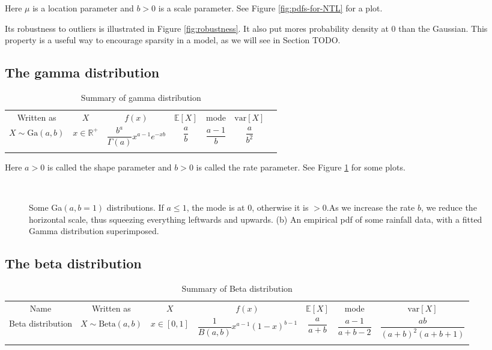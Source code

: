 Here $\mu$ is a location parameter and $b>0$ is a scale parameter. See Figure \ref{fig:pdfs-for-NTL} for a plot.

Its robustness to outliers is illustrated in Figure \ref{fig:robustness}. It also put mores probability density at 0 than the Gaussian. This property is a useful way to encourage sparsity in a model, as we will see in Section TODO.


\subsection{The gamma distribution}

\begin{table}
\caption{Summary of gamma distribution}
\centering
\begin{tabular}{ccccccc}
\hline\noalign{\smallskip}
Written as & $X$ & $f(x)$ & $\mathbb{E}[X]$ & mode & $\text{var}[X]$ \\
\noalign{\smallskip}\svhline\noalign{\smallskip}
$X \sim \text{Ga}(a,b)$ & $x \in \mathbb{R}^+$ & $\dfrac{b^a}{\Gamma(a)}x^{a-1}e^{-xb}$ & $\dfrac{a}{b}$ & $\dfrac{a-1}{b}$ & $\dfrac{a}{b^2}$ \\
\noalign{\smallskip}\hline
\end{tabular}
\end{table} 

Here $a>0$ is called the shape parameter and $b>0$ is called the rate parameter. See Figure \ref{fig:gamma-distribution} for some plots.

\begin{figure}[hbtp]
\centering
{} \\
\caption{Some Ga$(a, b=1)$ distributions. If $a \leq 1$, the mode is at 0, otherwise it is $>0$.As we increase the rate $b$, we reduce the horizontal scale, thus squeezing everything leftwards and upwards. (b) An empirical pdf of some rainfall data, with a fitted Gamma distribution superimposed.}
\label{fig:gamma-distribution} 
\end{figure}


\subsection{The beta distribution}

\begin{table*}
\caption{Summary of Beta distribution}\label{tab:beta-distribution}
\centering
\begin{tabular}{ccccccc}
\hline\noalign{\smallskip}
Name & Written as & $X$ & $f(x)$ & $\mathbb{E}[X]$ & mode & $\text{var}[X]$ \\
\noalign{\smallskip}\svhline\noalign{\smallskip}
Beta distribution & $X \sim \text{Beta}(a,b)$ & $x \in [0,1]$ & $\dfrac{1}{B(a,b)}x^{a-1}(1-x)^{b-1}$ & $\dfrac{a}{a+b}$ & $\dfrac{a-1}{a+b-2}$ & $\dfrac{ab}{(a+b)^2(a+b+1)}$ \\
\noalign{\smallskip}\hline
\end{tabular}
\end{table*} 

